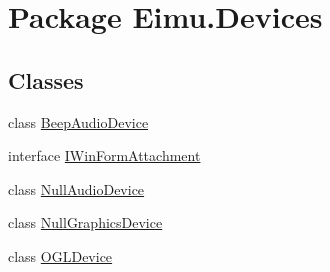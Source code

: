 \hypertarget{namespace_eimu_1_1_devices}{
\section{Package Eimu.Devices}
\label{namespace_eimu_1_1_devices}
}
\subsection*{Classes}
\begin{DoxyCompactItemize}
\item 
class \hyperlink{class_eimu_1_1_devices_1_1_beep_audio_device}{BeepAudioDevice}
\item 
interface \hyperlink{interface_eimu_1_1_devices_1_1_i_win_form_attachment}{IWinFormAttachment}
\item 
class \hyperlink{class_eimu_1_1_devices_1_1_null_audio_device}{NullAudioDevice}
\item 
class \hyperlink{class_eimu_1_1_devices_1_1_null_graphics_device}{NullGraphicsDevice}
\item 
class \hyperlink{class_eimu_1_1_devices_1_1_o_g_l_device}{OGLDevice}
\end{DoxyCompactItemize}
